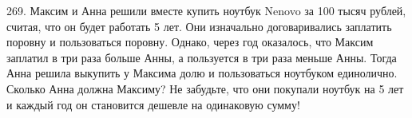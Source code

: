 269. Максим и Анна решили вместе купить ноутбук Nenovo за 100 тысяч рублей, считая, что он будет работать 5 лет. Они изначально договаривались заплатить поровну и пользоваться поровну. Однако, через год оказалось, что Максим заплатил в три раза больше Анны, а пользуется в три раза меньше Анны. Тогда Анна решила выкупить у Максима долю и пользоваться ноутбуком единолично. Сколько Анна должна Максиму? Не забудьте, что они покупали ноутбук на 5 лет и каждый год он становится дешевле на одинаковую сумму!\\
